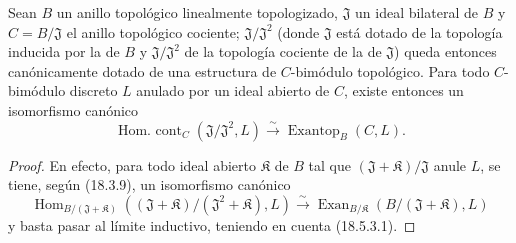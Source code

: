 \begin{proposition}[18.5.4]
\label{0.18.5.4-es}
Sean $B$ un anillo topológico linealmente topologizado, $\mathfrak J$ un
ideal bilateral de $B$ y $C=B/\mathfrak J$ el anillo topológico cociente;
$\mathfrak J/\mathfrak J^2$ (donde $\mathfrak J$ está dotado de la topología inducida
por la de $B$ y $\mathfrak J/\mathfrak J^2$ de la topología cociente de
la de $\mathfrak J$) queda entonces canónicamente dotado de una estructura de
$C$-bimódulo topológico. Para todo $C$-bimódulo discreto $L$ anulado por un
ideal abierto de $C$, existe entonces un isomorfismo canónico
\begin{equation}
\label{0.18.5.4.1-es}
\tag{18.5.4.1}
  \operatorname{Hom.\ cont}_C(\mathfrak J/\mathfrak J^2,L)
  \xrightarrow{\sim}\operatorname{Exantop}_B(C,L).
\end{equation}
\end{proposition}

\begin{proof}
En efecto, para todo ideal abierto $\mathfrak K$ de $B$ tal que
$(\mathfrak J+\mathfrak K)/\mathfrak J$ anule $L$, se tiene, según (18.3.9),
un isomorfismo canónico
\[
  \operatorname{Hom}_{B/(\mathfrak J+\mathfrak K)}
    ((\mathfrak J+\mathfrak K)/(\mathfrak J^2+\mathfrak K),L)
  \xrightarrow{\sim}
  \operatorname{Exan}_{B/\mathfrak K}(B/(\mathfrak J+\mathfrak K),L)
\]
y basta pasar al límite inductivo, teniendo en cuenta (18.5.3.1).
\end{proof}
